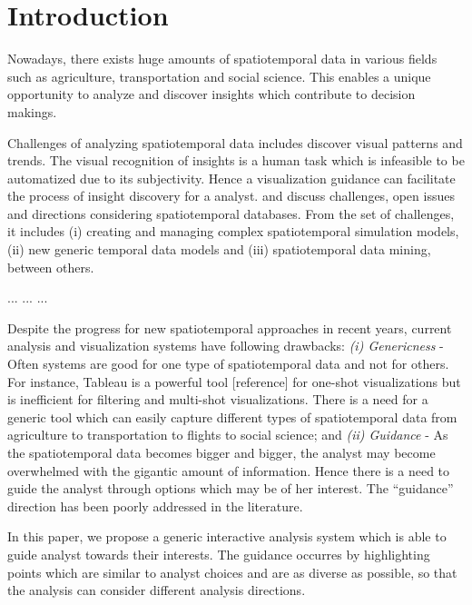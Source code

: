\documentclass{sig-alternate-05-2015}
\begin{document}

\section{Introduction} 

Nowadays, there exists huge amounts of spatiotemporal data in various fields such as agriculture, transportation and social science. This enables a unique opportunity to analyze and discover insights which contribute to decision makings. 

Challenges of analyzing spatiotemporal data includes discover visual patterns and trends. The visual recognition of insights is a human task which is infeasible to be automatized due to its subjectivity. Hence a visualization guidance can facilitate the process of insight discovery for a analyst. \cite{RoddickEHPS04} and \cite{Telang:2012} discuss challenges, open issues and directions considering spatiotemporal databases. From the set of challenges, it includes (i) creating and managing complex spatiotemporal simulation models, (ii) new generic temporal data models and (iii) spatiotemporal data mining, between others. 

...
...
...

Despite the progress for new spatiotemporal approaches in recent years, current analysis and visualization systems have following drawbacks: \textit{(i) Genericness} - Often systems are good for one type of spatiotemporal data and not for others. For instance, Tableau is a powerful tool [reference] for one-shot visualizations but is inefficient for filtering and multi-shot visualizations. There is a need for a generic tool which can easily capture different types of spatiotemporal data from agriculture to transportation to flights to social science; and \textit{(ii) Guidance} - As the spatiotemporal data becomes bigger and bigger, the analyst may become overwhelmed with the gigantic amount of information. Hence there is a need to guide the analyst through options which may be of her interest. The “guidance” direction has been poorly addressed in the literature.


In this paper, we propose a generic interactive analysis system which is able to guide analyst towards their interests. The guidance occurres by highlighting points which are similar to analyst choices and are as diverse as possible, so that the analysis can consider different analysis directions.
\end{document}
